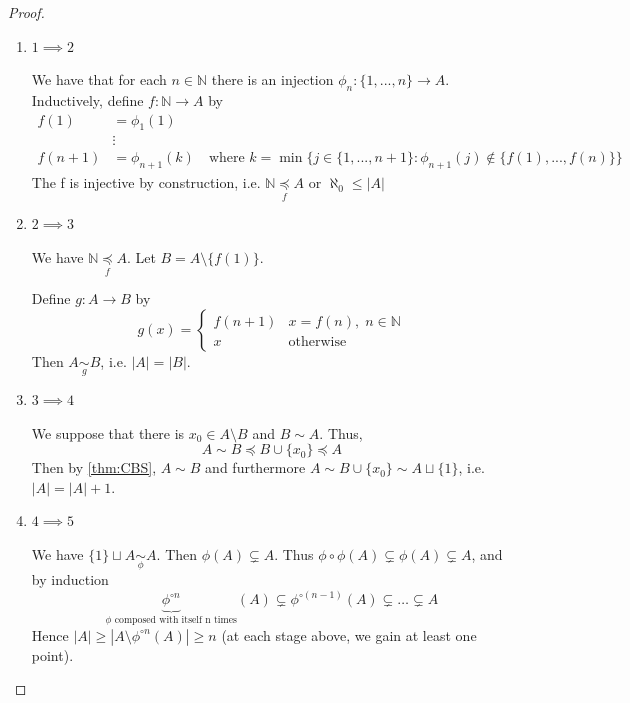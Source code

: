 \documentclass[11pt, oneside]{book}
\theoremstyle{break}
\newtheorem*{proof}{Proof}
\newcommand{\bb}[1]{\mathbb{#1}}			%
\begin{document}
\begin{proof}
	\begin{enumerate}
		\item $1 \implies 2$

			We have that for each $n \in \bb{N}$ there is an injection $\phi_n : \{1, ..., n\} \to A$. Inductively, define $f: \bb{N} \to A$ by
			\begin{align*}
				f(1) &= \phi_1(1) \\
					&\vdots \\
				f(n+1)	&= \phi_{n + 1}(k) \quad \text{where $k = \min\{j \in \{1, ..., n + 1\} : \phi_{n + 1}(j) \notin \{f(1), ..., f(n)\}\}$}
			\end{align*}
			The f is injective by construction, i.e. $\bb{N} \underset{f}{\preceq} A$ or $\aleph_0 \leq |A|$

		\item $2 \implies 3$

			We have $\bb{N} \underset{f}{\preceq} A$. Let $B = A \setminus \{f(1)\}$.

			Define $g: A \to B$ by
			\begin{equation}
				g(x) =
					\begin{cases}
						f(n + 1) & x = f(n), \; n \in \bb{N} \\
						x 			 & \text{otherwise}
					\end{cases}
			\end{equation}
			Then $A \underset{g}{\sim} B$, i.e. $|A| = |B|$.

		\item $3 \implies 4$

			We suppose that there is $x_0 \in A \setminus B$ and $B \sim A$. Thus,
			\begin{equation}
				A \sim B \preceq B \cup \{x_0\} \preceq A
			\end{equation}
			Then by \autoref{thm:CBS}, $A \sim B$ and furthermore $A \sim B \cup \{x_0\} \sim A \sqcup \{1\}$, i.e. $|A| = |A| + 1$.

		\item $4 \implies 5$

			We have $\{1\} \sqcup A \underset{\phi}{\sim} A$. Then $\phi(A) \subsetneq A$. Thus $\phi \circ \phi (A) \subsetneq \phi(A) \subsetneq A$, and by induction
			\begin{equation}
				\underbrace{\phi^{\circ n}}_{\phi \text{ composed with itself n times}} (A) \subsetneq \phi^{\circ (n - 1)} (A) \subsetneq \hdots \subsetneq A
			\end{equation}
			Hence $|A| \geq |A \setminus \phi^{\circ n} (A)| \geq n$ (at each stage above, we gain at least one point).


\end{enumerate}
\end{proof}
\end{document}
